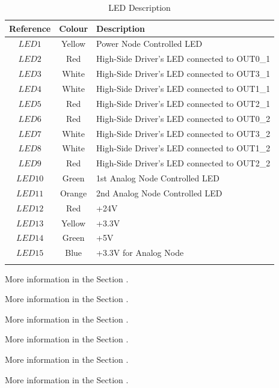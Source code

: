 \documentclass[10pt]{datasheet}
\begin{document}
\begin{table}[H]
\begin{threeparttable}
\caption{LED Description}
\label{table:led}
\begin{tabularx}{\textwidth}{ c | c | X }
    \thickhline
    \textbf{Reference} & \textbf{Colour} & \textbf{Description} \\
    \hline
    $LED1$ & Yellow & Power Node Controlled LED\tnote{1}  \\
    \hline
    $LED2$ & Red & High-Side Driver's LED connected to OUT0\_1\tnote{2} \\
    \hline
    $LED3$ & White & High-Side Driver's LED connected to OUT3\_1\tnote{2} \\
    \hline
    $LED4$ & White & High-Side Driver's LED connected to OUT1\_1\tnote{2} \\
    \hline
    $LED5$ & Red & High-Side Driver's LED connected to OUT2\_1\tnote{2}\\
    \hline
    $LED6$ & Red & High-Side Driver's LED connected to OUT0\_2\tnote{2}\\
    \hline
    $LED7$ & White & High-Side Driver's LED connected to OUT3\_2\tnote{2}\\
    \hline
    $LED8$ & White & High-Side Driver's LED connected to OUT1\_2\tnote{2} \\
    \hline
    $LED9$ & Red & High-Side Driver's LED connected to OUT2\_2\tnote{2} \\
    \hline
    $LED10$ & Green & 1st Analog Node Controlled LED\tnote{3}\\
    \hline
    $LED11$ & Orange & 2nd Analog Node Controlled LED\tnote{3} \\
    \hline
    $LED12$ & Red & +24V\tnote{4} \\
    \hline
    $LED13$ & Yellow & +3.3V\tnote{4} \\
    \hline
    $LED14$ & Green & +5V\tnote{4} \\
    \hline
    $LED15$ & Blue & +3.3V for Analog Node\tnote{5}\\
    \hline
    \thickhline
\end{tabularx}
\begin{tablenotes}
\item[1] {More information in the Section .}
\item[2] {More information in the Section .}
\item[3] {More information in the Section .}
\item[4] {More information in the Section .}
\item[5] {More information in the Section .}
\item[6] {More information in the Section .}
\end{tablenotes}
\end{threeparttable}
\end{table}
\newpage
\end{document}
